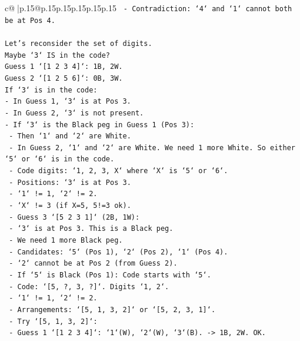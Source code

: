 \documentclass{article}
\begin{document}
{\begin{supertabular}{c@{$\;$}|p{.15\linewidth}@{}p{.15\linewidth}p{.15\linewidth}p{.15\linewidth}p{.15\linewidth}p{.15\linewidth}}
{{{\texttt{    {-} Contradiction: `4` and `1` cannot both be at Pos 4.} \\
\\ 
\texttt{Let's reconsider the set of digits.} \\
\texttt{Maybe `3` IS in the code?} \\
\texttt{Guess 1 `{[}1 2 3 4{]}`: 1B, 2W.} \\
\texttt{Guess 2 `{[}1 2 5 6{]}`: 0B, 3W.} \\
\texttt{If `3` is in the code:} \\
\texttt{{-} In Guess 1, `3` is at Pos 3.} \\
\texttt{{-} In Guess 2, `3` is not present.} \\
\texttt{{-} If `3` is the Black peg in Guess 1 (Pos 3):} \\
\texttt{    {-} Then `1` and `2` are White.} \\
\texttt{    {-} In Guess 2, `1` and `2` are White. We need 1 more White. So either `5` or `6` is in the code.} \\
\texttt{    {-} Code digits: `1, 2, 3, X` where `X` is `5` or `6`.} \\
\texttt{    {-} Positions: `3` is at Pos 3.} \\
\texttt{    {-} `1` != 1, `2` != 2.} \\
\texttt{    {-} `X` != 3 (if X=5, 5!=3 ok).} \\
\texttt{    {-} Guess 3 `{[}5 2 3 1{]}` (2B, 1W):} \\
\texttt{        {-} `3` is at Pos 3. This is a Black peg.} \\
\texttt{        {-} We need 1 more Black peg.} \\
\texttt{        {-} Candidates: `5` (Pos 1), `2` (Pos 2), `1` (Pos 4).} \\
\texttt{        {-} `2` cannot be at Pos 2 (from Guess 2).} \\
\texttt{        {-} If `5` is Black (Pos 1): Code starts with `5`.} \\
\texttt{            {-} Code: `{[}5, ?, 3, ?{]}`. Digits `1, 2`.} \\
\texttt{            {-} `1` != 1, `2` != 2.} \\
\texttt{            {-} Arrangements: `{[}5, 1, 3, 2{]}` or `{[}5, 2, 3, 1{]}`.} \\
\texttt{            {-} Try `{[}5, 1, 3, 2{]}`:} \\
\texttt{                {-} Guess 1 `{[}1 2 3 4{]}`: `1`(W), `2`(W), `3`(B). {-}> 1B, 2W. OK.} \\
}}}
\end{supertabular}}
\end{document}
